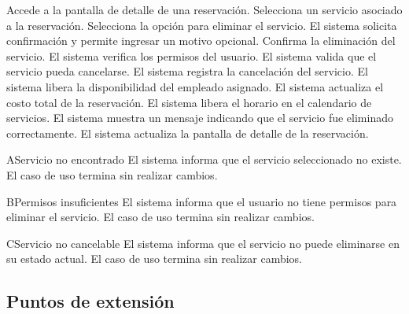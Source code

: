 \begin{UCtrayectoria}
	\UCpaso[\UCactor] Accede a la pantalla de detalle de una reservación.
	\UCpaso[\UCactor] Selecciona un servicio asociado a la reservación.
	\UCpaso[\UCactor] Selecciona la opción para eliminar el servicio.
	\UCpaso El sistema solicita confirmación y permite ingresar un motivo opcional.
	\UCpaso[\UCactor] Confirma la eliminación del servicio.
	\UCpaso El sistema verifica los permisos del usuario.
	\UCpaso El sistema valida que el servicio pueda cancelarse.
	\UCpaso El sistema registra la cancelación del servicio.
	\UCpaso El sistema libera la disponibilidad del empleado asignado.
	\UCpaso El sistema actualiza el costo total de la reservación.
	\UCpaso El sistema libera el horario en el calendario de servicios.
	\UCpaso El sistema muestra un mensaje indicando que el servicio fue eliminado correctamente.
	\UCpaso El sistema actualiza la pantalla de detalle de la reservación.
\end{UCtrayectoria}

\begin{UCtrayectoriaA}{A}{Servicio no encontrado}
	\UCpaso El sistema informa que el servicio seleccionado no existe.
	\UCpaso El caso de uso termina sin realizar cambios.
\end{UCtrayectoriaA}

\begin{UCtrayectoriaA}{B}{Permisos insuficientes}
	\UCpaso El sistema informa que el usuario no tiene permisos para eliminar el servicio.
	\UCpaso El caso de uso termina sin realizar cambios.
\end{UCtrayectoriaA}

\begin{UCtrayectoriaA}{C}{Servicio no cancelable}
	\UCpaso El sistema informa que el servicio no puede eliminarse en su estado actual.
	\UCpaso El caso de uso termina sin realizar cambios.
\end{UCtrayectoriaA}

\subsection{Puntos de extensión}

